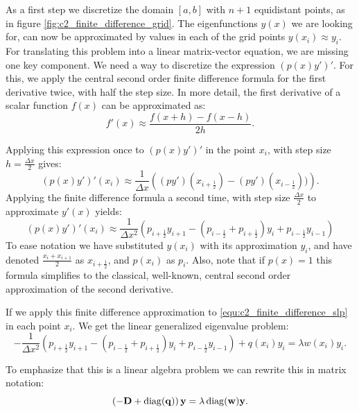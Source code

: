 As a first step we discretize the domain $[a, b]$ with $n+1$ equidistant points, as in figure \ref{fig:c2_finite_difference_grid}. The eigenfunctions $y(x)$ we are looking for, can now be approximated by values in each of the grid points $y(x_i) \approx y_i$. For translating this problem into a linear matrix-vector equation, we are missing one key component. We need a way to discretize the expression $(p(x) y')'$. For this, we apply the central second order finite difference formula for the first derivative twice, with half the step size. In more detail, the first derivative of a scalar function $f(x)$ can be approximated as:
$$
    f'(x) \approx \frac{f(x + h) - f(x - h)}{2h}\text{.}
$$

Applying this expression once to $(p(x) y')'$ in the point $x_i$, with step size $h = \frac{\Delta x}{2}$ gives:
$$
    (p(x) y')'(x_i) \approx \frac{1}{\Delta x}\left((p y')\left(x_{i+\frac{1}{2}}\right) - (p y')\left(x_{i-\frac{1}{2}}\right))\right)\text{.}
$$
Applying the finite difference formula a second time, with step size $\frac{\Delta x}{2}$ to approximate $y'(x)$ yields:
$$
    (p(x) y')'(x_i) \approx \frac{1}{\Delta x^2}\left(p_{i+\frac{1}{2}} y_{i+1} - \left(p_{i-\frac{1}{2}} + p_{i+\frac{1}{2}}\right) y_i + p_{i-\frac{1}{2}} y_{i-1}\right)
$$
To ease notation we have substituted $y(x_i)$ with its approximation $y_i$, and have denoted $\frac{x_i + x_{i+1}}{2}$ as $x_{i+\frac{1}{2}}$, and $p(x_i)$ as $p_i$. Also, note that if $p(x) = 1$ this formula simplifies to the classical, well-known, central second order approximation of the second derivative.

If we apply this finite difference approximation to \eqref{equ:c2_finite_difference_slp} in each point $x_i$. We get the linear generalized eigenvalue problem:
$$
    -\frac{1}{\Delta x^2}\left(p_{i+\frac{1}{2}} y_{i+1} - \left(p_{i-\frac{1}{2}} + p_{i+\frac{1}{2}}\right) y_i + p_{i-\frac{1}{2}} y_{i-1}\right) + q(x_i) y_i = \lambda w(x_i) y_i \text{.}
$$

To emphasize that this is a linear algebra problem we can rewrite this in matrix notation:
\begin{equation}\label{equ:c2_finite_difference_matrix_problem}
    \left(-\vb{D} + \operatorname{diag}(\vb{q})\right)\vb{y} = \lambda \operatorname{diag}(\vb{w}) \vb{y}\text{.}
\end{equation}

